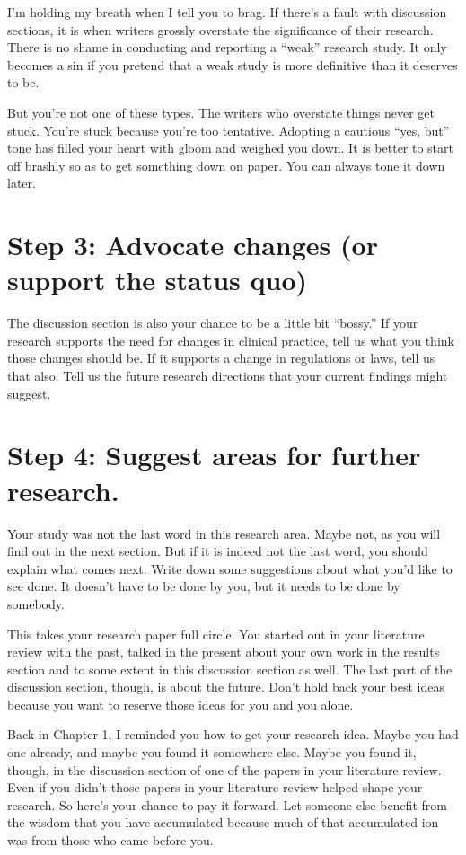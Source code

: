 \documentclass[
  letterpaper,
  DIV=11,
  numbers=noendperiod]{scrreprt}
\begin{document}
I'm holding my breath when I tell you to brag. If there's a fault with
discussion sections, it is when writers grossly overstate the
significance of their research. There is no shame in conducting and
reporting a ``weak'' research study. It only becomes a sin if you
pretend that a weak study is more definitive than it deserves to be.

But you're not one of these types. The writers who overstate things
never get stuck. You're stuck because you're too tentative. Adopting a
cautious ``yes, but'' tone has filled your heart with gloom and weighed
you down. It is better to start off brashly so as to get something down
on paper. You can always tone it down later.

\section{Step 3: Advocate changes (or support the status
quo)}\label{step-3-advocate-changes-or-support-the-status-quo}

The discussion section is also your chance to be a little bit ``bossy.''
If your research supports the need for changes in clinical practice,
tell us what you think those changes should be. If it supports a change
in regulations or laws, tell us that also. Tell us the future research
directions that your current findings might suggest.

\section{Step 4: Suggest areas for further
research.}\label{step-4-suggest-areas-for-further-research.}

Your study was not the last word in this research area. Maybe not, as
you will find out in the next section. But if it is indeed not the last
word, you should explain what comes next. Write down some suggestions
about what you'd like to see done. It doesn't have to be done by you,
but it needs to be done by somebody.

This takes your research paper full circle. You started out in your
literature review with the past, talked in the present about your own
work in the results section and to some extent in this discussion
section as well. The last part of the discussion section, though, is
about the future. Don't hold back your best ideas because you want to
reserve those ideas for you and you alone.

Back in Chapter 1, I reminded you how to get your research idea. Maybe
you had one already, and maybe you found it somewhere else. Maybe you
found it, though, in the discussion section of one of the papers in your
literature review. Even if you didn't those papers in your literature
review helped shape your research. So here's your chance to pay it
forward. Let someone else benefit from the wisdom that you have
accumulated because much of that accumulated ion was from those who came
before you.
\end{document}
